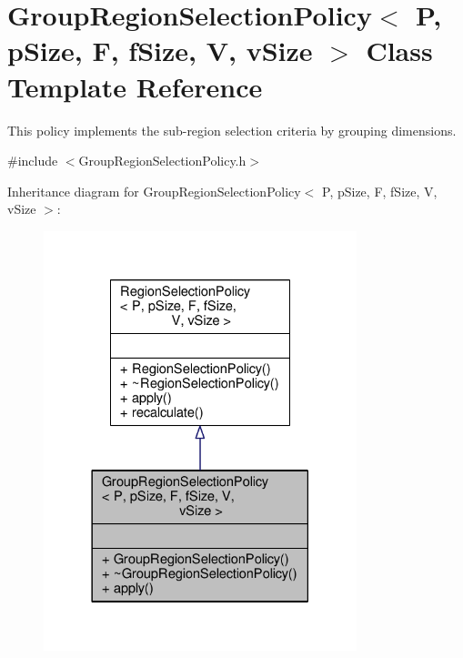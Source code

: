 \hypertarget{classGroupRegionSelectionPolicy}{}\section{Group\+Region\+Selection\+Policy$<$ P, p\+Size, F, f\+Size, V, v\+Size $>$ Class Template Reference}
\label{classGroupRegionSelectionPolicy}


This policy implements the sub-\/region selection criteria by grouping dimensions.  




{\ttfamily \#include $<$Group\+Region\+Selection\+Policy.\+h$>$}



Inheritance diagram for Group\+Region\+Selection\+Policy$<$ P, p\+Size, F, f\+Size, V, v\+Size $>$\+:\nopagebreak
\begin{figure}[H]
\begin{center}
\leavevmode
\includegraphics[width=258pt]{classGroupRegionSelectionPolicy__inherit__graph}
\end{center}
\end{figure}


